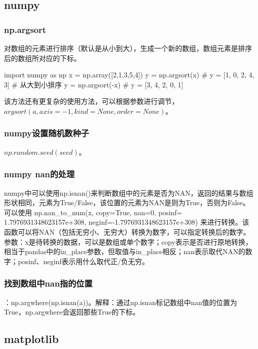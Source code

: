 \subsection{numpy}
\subsubsection{np.argsort} 对数组的元素进行排序（默认是从小到大），生成一个新的数组，数组元素是排序后的数组所对应的下标。
\begin{python}
	import numpy as np
	x = np.array([2,1,3,5,4])
	y = np.argsort(x) # y = [1, 0, 2, 4, 3]
	# 从大到小排序
	y = np.argsort(-x) # y = [3, 4, 2, 0, 1]
\end{python}
该方法还有更复杂的使用方法，可以根据参数进行调节，$argsort(a, axis=-1, kind=None, order=None)$。

\subsubsection{numpy设置随机数种子} $np.random.seed(seed)$。





\subsubsection{numpy nan的处理}numpy中可以使用np.isnan()来判断数组中的元素是否为NAN，返回的结果与数组形状相同，元素为True/False，该位置的元素为NAN是则为True，否则为False。可以使用 np.nan\_to\_num(x, copy=True, nan=0, posinf= 1.7976931348623157e+308, neginf=-1.7976931348623157e+308) 来进行转换。该函数可以将NAN（包括无穷小、无穷大）转换为数字，可以指定转换后的数字。参数：x是待转换的数据，可以是数组或单个数字；copy表示是否进行原地转换，相当于pandas中的in\_place参数，但取值与in\_place相反；nan表示取代NAN的数字；posinf、neginf表示用什么取代正/负无穷。

\subsubsection{找到数组中nan指的位置}：np.argwhere(np.isnan(a))。解释：通过np.isnan标记数组中nan值的位置为True，np.argwhere会返回那些True的下标。


\subsection{matplotlib}
